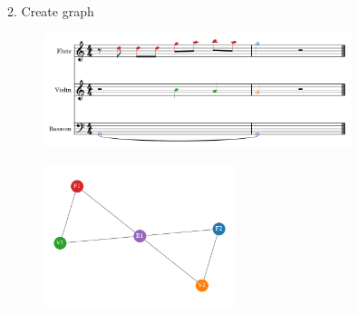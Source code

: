 \documentclass{beamer}
\begin{document}
\begin{frame}{2. Create graph}
    \begin{figure}
        \includegraphics[width=0.8\textwidth]{../Figures/toy-1.png}
    \end{figure}
    \pause
    \begin{figure}
        \includegraphics[width=0.5\textwidth]{../Figures/toy_graph.pdf}
    \end{figure}

\end{frame}
\end{document}
